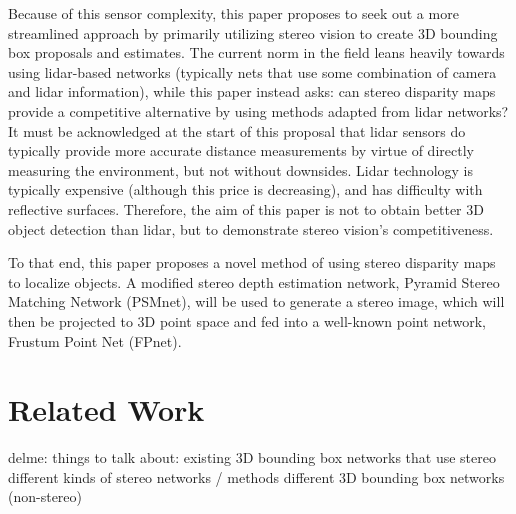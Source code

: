 
Because of this sensor complexity, this paper proposes to seek out a more streamlined approach by primarily utilizing stereo vision to create 3D bounding box proposals and estimates. The current norm in the field leans heavily towards using lidar-based networks (typically nets that use some combination of camera and lidar information), while this paper instead asks: can stereo disparity maps provide a competitive alternative by using methods adapted from lidar networks? It must be acknowledged at the start of this proposal that lidar sensors do typically provide more accurate distance measurements by virtue of directly measuring the environment, but not without downsides. Lidar technology is typically expensive (although this price is decreasing), and has difficulty with reflective surfaces. Therefore, the aim of this paper is not to obtain better 3D object detection than lidar, but to demonstrate stereo vision's competitiveness. 

To that end, this paper proposes a novel method of using stereo disparity maps to localize objects. A modified stereo depth estimation network, Pyramid Stereo Matching Network (PSMnet), will be used to generate a stereo image, which will then be projected to 3D point space and fed into a well-known point network, Frustum Point Net (FPnet).


\section{Related Work}
delme: things to talk about:
	existing 3D bounding box networks that use stereo
	different kinds of stereo networks / methods
	different 3D bounding box networks (non-stereo) \\


